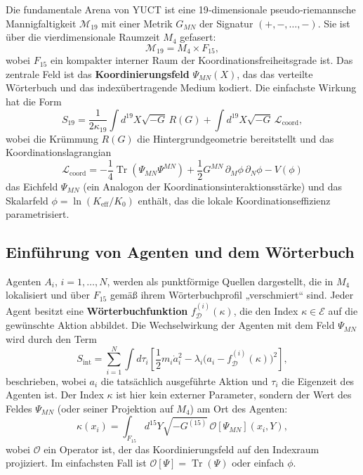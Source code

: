 \documentclass[12pt,a4paper]{article}
\DeclareMathOperator{\Tr}{Tr}
\begin{document}
	Die fundamentale Arena von YUCT ist eine 19‑dimensionale pseudo‑riemannsche Mannigfaltigkeit \(\mathcal{M}_{19}\) mit einer Metrik \(G_{MN}\) der Signatur \((+,-,\dots,-)\). Sie ist über die vierdimensionale Raumzeit \(M_4\) gefasert:
	\begin{equation}
		\mathcal{M}_{19} = M_4 \times F_{15},
	\end{equation}
	wobei \(F_{15}\) ein kompakter interner Raum der Koordinationsfreiheitsgrade ist. Das zentrale Feld ist das \textbf{Koordinierungsfeld} \(\Psi_{MN}(X)\), das das verteilte Wörterbuch und das indexübertragende Medium kodiert. Die einfachste Wirkung hat die Form
	\begin{equation}
		S_{19} = \frac{1}{2\kappa_{19}} \int d^{19}X \sqrt{-G}\, R(G) + \int d^{19}X \sqrt{-G}\, \mathcal{L}_{\mathrm{coord}},
		\label{eq:S19}
	\end{equation}
	wobei die Krümmung \(R(G)\) die Hintergrundgeometrie bereitstellt und das Koordinationslagrangian
	\begin{equation}
		\mathcal{L}_{\mathrm{coord}} = -\frac{1}{4} \Tr(\Psi_{MN}\Psi^{MN}) + \frac{1}{2} G^{MN}\,\partial_M \phi\,\partial_N \phi - V(\phi)
		\label{eq:Lcoord}
	\end{equation}
	das Eichfeld \(\Psi_{MN}\) (ein Analogon der Koordinationsinteraktionsstärke) und das Skalarfeld \(\phi = \ln(K_{\mathrm{eff}}/K_0)\) enthält, das die lokale Koordinationseffizienz parametrisiert.
	
	\subsection{Einführung von Agenten und dem Wörterbuch}
	
	Agenten \(A_i\), \(i=1,\dots,N\), werden als punktförmige Quellen dargestellt, die in \(M_4\) lokalisiert und über \(F_{15}\) gemäß ihrem Wörterbuchprofil „verschmiert“ sind. Jeder Agent besitzt eine \textbf{Wörterbuchfunktion} \(f_{\mathcal{D}}^{(i)}(\kappa)\), die den Index \(\kappa \in \mathcal{E}\) auf die gewünschte Aktion abbildet. Die Wechselwirkung der Agenten mit dem Feld \(\Psi_{MN}\) wird durch den Term
	\begin{equation}
		S_{\mathrm{int}} = \sum_{i=1}^{N} \int d\tau_i \left[ \frac{1}{2} m_i \dot a_i^2 - \lambda_i \bigl( a_i - f_{\mathcal{D}}^{(i)}(\kappa) \bigr)^2 \right],
		\label{eq:Sint}
	\end{equation}
	beschrieben, wobei \(a_i\) die tatsächlich ausgeführte Aktion und \(\tau_i\) die Eigenzeit des Agenten ist. Der Index \(\kappa\) ist hier kein externer Parameter, sondern der Wert des Feldes \(\Psi_{MN}\) (oder seiner Projektion auf \(M_4\)) am Ort des Agenten:
	\begin{equation}
		\kappa(x_i) = \int_{F_{15}} d^{15}Y \sqrt{-G^{(15)}}\, \mathcal{O}[\Psi_{MN}](x_i, Y),
		\label{eq:kappa}
	\end{equation}
	wobei \(\mathcal{O}\) ein Operator ist, der das Koordinierungsfeld auf den Indexraum projiziert. Im einfachsten Fall ist \(\mathcal{O}[\Psi] = \Tr(\Psi)\) oder einfach \(\phi\).
	
\end{document}
